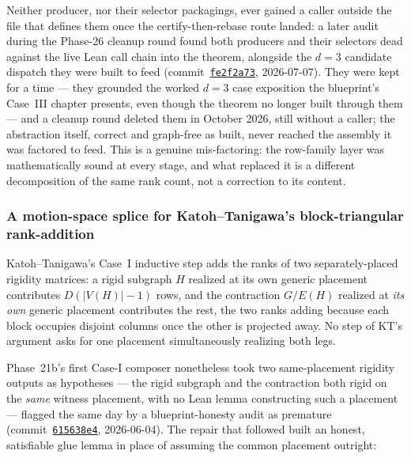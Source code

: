 Neither producer, nor their selector packagings, ever gained a caller
outside the file that defines them once the certify-then-rebase route
landed: a later audit during the Phase-26 cleanup round found both
producers and their selectors dead against the live Lean call chain into
the theorem, alongside the $d = 3$ candidate dispatch they were built to
feed
(commit~\href{https://github.com/bryangingechen/CombinatorialRigidity/commit/fe2f2a73c04e8bd0f557d1b30d0f704c31d54967}{\texttt{fe2f2a73}},
2026-07-07). They were kept for a time --- they grounded the worked
$d = 3$ case exposition the blueprint's Case~III chapter presents, even
though the theorem no longer built through them --- and a cleanup round
deleted them in October 2026, still without a caller; the abstraction
itself, correct and graph-free as built, never reached the assembly it was
factored to feed. This is a genuine mis-factoring: the row-family layer was
mathematically sound at every stage, and what replaced it is a different
decomposition of the same rank count, not a correction to its content.

\subsubsection{A motion-space splice for Katoh--Tanigawa's block-triangular rank-addition}

Katoh--Tanigawa's Case~I inductive step \cite[eq.~(6.3)]{katohTanigawa2011} adds the ranks of two
separately-placed rigidity matrices: a rigid subgraph $H$ realized at its
own generic placement contributes $D(|V(H)|-1)$ rows, and the contraction
$G/E(H)$ realized at \emph{its own} generic placement contributes the rest,
the two ranks adding because each block occupies disjoint columns once the
other is projected away. No step of KT's argument asks for one placement
simultaneously realizing both legs.

Phase~21b's first Case-I composer nonetheless took two same-placement
rigidity outputs as hypotheses --- the rigid subgraph and the contraction
both rigid on the \emph{same} witness placement, with no Lean lemma
constructing such a placement --- flagged the same day by a
blueprint-honesty audit as premature
(commit~\href{https://github.com/bryangingechen/CombinatorialRigidity/commit/615638e47acc520ba9c3ca7b0c024b21c44cf3c4}{\texttt{615638e4}},
2026-06-04). The repair that followed built an honest, satisfiable glue
lemma in place of assuming the common placement outright:

